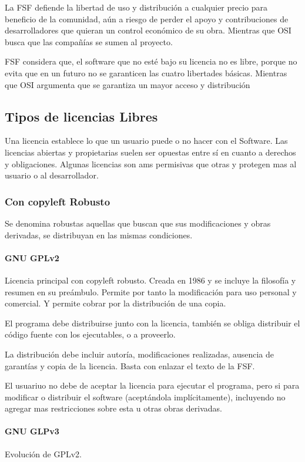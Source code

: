         La FSF defiende la libertad de uso y distribución a cualquier precio para beneficio de la comunidad, aún a riesgo de perder el apoyo y contribuciones de desarrolladores que quieran un control económico de su obra. Mientras que OSI busca que las compañías se sumen al proyecto.

        FSF considera que, el software que no esté bajo su licencia no es libre, porque no evita que en un futuro no se garanticen las cuatro libertades básicas. Mientras que OSI argumenta que se garantiza un mayor acceso y distribución

\subsection{Tipos de licencias Libres}
    Una licencia establece lo que un usuario puede o no hacer con el Software. Las licencias abiertas y propietarias suelen ser opuestas entre sí en cuanto a derechos y obligaciones. Algunas licencias son ams permisivas que otras y protegen mas al usuario o al desarrollador.

    \subsubsection{Con copyleft Robusto}
        Se denomina robustas aquellas que buscan que sus modificaciones y obras derivadas, se distribuyan en las mismas condiciones.

        \paragraph{GNU GPLv2}
            Licencia principal con copyleft robusto. Creada en 1986 y se incluye la filosofía y resumen en su preámbulo. Permite por tanto la modificación para uso personal y comercial. Y permite cobrar por la distribución de una copia.

            El programa debe distribuirse junto con la licencia, también se obliga distribuir el código fuente con los ejecutables, o a proveerlo.

            La distribución debe incluir autoría, modificaciones realizadas, ausencia de garantías y copia de la licencia. Basta con enlazar el texto de la FSF.

            El usuariuo no debe de aceptar la licencia para ejecutar el programa, pero si para modificar o distribuir el software (aceptándola implícitamente), incluyendo no agregar mas restricciones sobre esta u otras obras derivadas.
        \paragraph{GNU GLPv3}
            Evolución de GPLv2.
            
